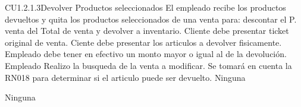 \begin{UseCase} {CU1.2.1.3}{Devolver Productos seleccionados}{
	El empleado recibe los productos devueltos y quita los productos seleccionados de una venta para: descontar el P. venta del Total de venta y devolver a inventario.
}
	{
		\UCli Cliente debe presentar ticket original de venta.
		\UCli Ciente debe presentar los articulos a devolver fisicamente.
		\UCli Empleado debe tener en efectivo un monto mayor o igual al de la devolución.
		\UCli Empleado Realizo la busqueda de la venta a modificar.
		\UCli Se tomará en cuenta la RN018 para determinar si el articulo puede ser devuelto.
	}
	{
		Ninguna
	}
	{
		\UCli {}
		\UCli {}
		\UCli {}
		\UCli {}
		\UCli {}
		\UCli {}
		
	}
	{
		Ninguna
	}
\end{UseCase}


